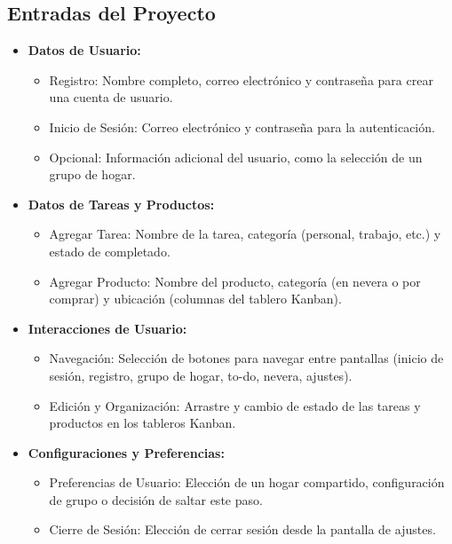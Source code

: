 \documentclass{article}
\begin{document}
\begin{itemize}
    \subsection {Entradas del Proyecto}
    \begin{itemize}
        \item \textbf{Datos de Usuario:}
        \begin{itemize}
            \item Registro: Nombre completo, correo electrónico y contraseña para crear una cuenta de usuario.
            \item Inicio de Sesión: Correo electrónico y contraseña para la autenticación.
            \item Opcional: Información adicional del usuario, como la selección de un grupo de hogar.
        \end{itemize}
        
        \item \textbf{Datos de Tareas y Productos:}
        \begin{itemize}
            \item Agregar Tarea: Nombre de la tarea, categoría (personal, trabajo, etc.) y estado de completado.
            \item Agregar Producto: Nombre del producto, categoría (en nevera o por comprar) y ubicación (columnas del tablero Kanban).
        \end{itemize}
        
        \item \textbf{Interacciones de Usuario:}
        \begin{itemize}
            \item Navegación: Selección de botones para navegar entre pantallas (inicio de sesión, registro, grupo de hogar, to-do, nevera, ajustes).
            \item Edición y Organización: Arrastre y cambio de estado de las tareas y productos en los tableros Kanban.
        \end{itemize}
        
        \item \textbf{Configuraciones y Preferencias:}
        \begin{itemize}
            \item Preferencias de Usuario: Elección de un hogar compartido, configuración de grupo o decisión de saltar este paso.
            \item Cierre de Sesión: Elección de cerrar sesión desde la pantalla de ajustes.
        \end{itemize}
    \end{itemize}
    \clearpage

\end{itemize}
\end{document}
